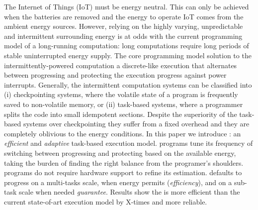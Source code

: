 The Internet of Things (IoT) must be energy neutral. This can only be achieved when the batteries are removed and the energy to operate IoT comes from the ambient energy sources.
However, relying on the highly varying, unpredictable and intermittent surrounding energy is at odds with the current programming model of a long-running computation: long computations require long periods of stable uninterrupted energy supply. 
The core programming model solution to the intermittently-powered computation a discrete-like execution that alternates between progressing and protecting the execution progress against power interrupts.
Generally, the intermittent computation systems can be classified into (i) checkpointing systems, where the volatile state of a program is frequently saved to non-volatile memory, or (ii) task-based systems, where a programmer splits the code into small idempotent sections. Despite the superiority of the task-based systems over checkpointing they suffer from a fixed overhead and they are completely oblivious to the energy conditions.   
In this paper we introduce \sys: an \emph{efficient} and \emph{adaptive} task-based execution model.
\sys programs tune its frequency of switching between progressing and protecting based on the available energy, taking the burden of finding the right balance from the programer's shoulders.
\sys programs do not require hardware support to refine its estimation. 
\sys defaults to progress on a multi-tasks scale, when energy permits (\emph{efficiency}), and on a sub-task scale when needed {\emph{guarantee}}. 
Results show the \sys is more efficient than the current state-of-art execution model by X-times and more reliable. 

